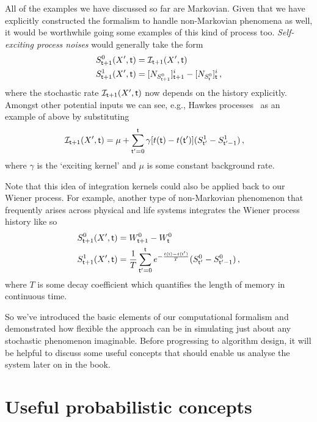 \documentclass{book}
\begin{document}
All of the examples we have discussed so far are Markovian. Given that we have explicitly constructed the formalism to handle non-Markovian phenomena as well, it would be worthwhile going some examples of this kind of process too. \emph{Self-exciting process noises} would generally take the form
\begin{align}
S^{0}_{{\sf t}+1}(X',{\sf t}) &= {\cal I}_{{\sf t}+1} (X',{\sf t}) \\
S^{1}_{{\sf t}+1}(X',{\sf t}) &= [N_{S^{0}_{{\sf t}+1}}]^i_{{\sf t}+1}-[N_{S^{0}_{{\sf t}}}]^i_{\sf t} \,,
\end{align}
where the stochastic rate ${\cal I}_{{\sf t}+1} (X',{\sf t})$ now depends on the history explicitly. Amongst other potential inputs we can see, e.g., Hawkes processes~\cite{hawkes1971spectra} as an example of above by substituting 
\begin{align}
{\cal I}_{{\sf t}+1} (X',{\sf t}) &= \mu + \sum^{{\sf t}}_{{\sf t}'=0}\gamma [t({\sf t})-t({\sf t}')](S^{1}_{{\sf t}'}-S^{1}_{{\sf t}'-1}) \,,
\end{align}
where $\gamma$ is the `exciting kernel' and $\mu$ is some constant background rate. 

Note that this idea of integration kernels could also be applied back to our Wiener process. For example, another type of non-Markovian phenomenon that frequently arises across physical and life systems integrates the Wiener process history like so
\begin{align}
S^{0}_{{\sf t}+1}(X',{\sf t}) &= W^0_{{\sf t}+1}-W^0_{\sf t}\\
S^{1}_{{\sf t}+1}(X',{\sf t}) &= \frac{1}{T}\sum^{{\sf t}}_{{\sf t}'=0}e^{-\frac{t({\sf t})-t({\sf t}')}{T}} (S^{0}_{{\sf t}'}-S^{0}_{{\sf t}'-1}) \,,
\end{align}
where $T$ is some decay coefficient which quantifies the length of memory in continuous time.

So we've introduced the basic elements of our computational formalism and demonstrated how flexible the approach can be in simulating just about any stochastic phenomenon imaginable. Before progressing to algorithm design, it will be helpful to discuss some useful concepts that should enable us analyse the system later on in the book.

\section{\sffamily Useful probabilistic concepts}
\end{document}
